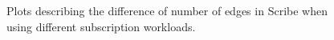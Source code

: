 \begin{figure}[Ht]
    \centering
    \label{fig:scribe_edges}
    \caption{Plots describing the difference of number of edges in
        Scribe when using different subscription workloads.}
\end{figure}

